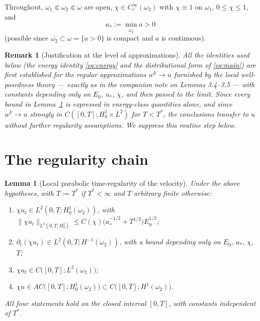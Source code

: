 \documentclass[11pt,letterpaper]{amsart}
\newtheorem{lemma}[theorem]{Lemma}
\newtheorem{remark}[theorem]{Remark}
\begin{document}
Throughout, $\omega_1\Subset\omega_2\Subset\omega$ are open, $\chi\in C_c^\infty(\omega_2)$ with
$\chi\equiv1$ on $\omega_1$, $0\le\chi\le1$, and
\begin{equation}\label{eq:astar}
a_*:=\min_{\overline{\omega_2}}a>0
\end{equation}
(possible since $\overline{\omega_2}\subset\omega=\{a>0\}$ is compact and $a$ is continuous).

\begin{remark}[Justification at the level of approximations]\label{rem:approx}
All the identities used below (the energy identity \eqref{eq:energy} and the distributional form
of \eqref{eq:main}) are first established for the regular approximations $w^k\to u$ furnished by
the local well-posedness theory --- exactly as in the companion note on Lemmas 3.4--3.5 --- with
constants depending only on $E_0$, $a_*$, $\chi$, and then passed to the limit. Since every bound
in Lemma~\ref{lem:chain} is expressed in energy-class quantities alone, and since $w^k\to u$
strongly in $C([0,T];H_0^1\times L^2)$ for $T<T^*$, the conclusions transfer to $u$ without
further regularity assumptions. We suppress this routine step below.
\end{remark}

\section{The regularity chain}

\begin{lemma}[Local parabolic time-regularity of the velocity]\label{lem:chain}
Under the above hypotheses, with $T:=T^*$ if $T^*<\infty$ and $T$ arbitrary finite otherwise:
\begin{enumerate}
\item[\rm(i)] $\chi u_t \in L^2(0,T;H_0^1(\omega_2))$, with
$\|\chi u_t\|_{L^2(0,T;H^1_0)}\le C(\chi)\big(a_*^{-1/2}+T^{1/2}\big)E_0^{1/2}$;
\item[\rm(ii)] $\partial_t(\chi u_t)\in L^2(0,T;H^{-1}(\omega_2))$, with a bound depending only on
$E_0$, $a_*$, $\chi$, $T$;
\item[\rm(iii)] $\chi u_t \in C\big([0,T];L^2(\omega_2)\big)$;
\item[\rm(iv)] $\chi u \in AC\big([0,T];H_0^1(\omega_2)\big)\subset C\big([0,T];H^1(\omega_2)\big)$.
\end{enumerate}
All four statements hold on the \emph{closed} interval $[0,T]$, with constants independent of
$T^*$.
\end{lemma}
\end{document}
